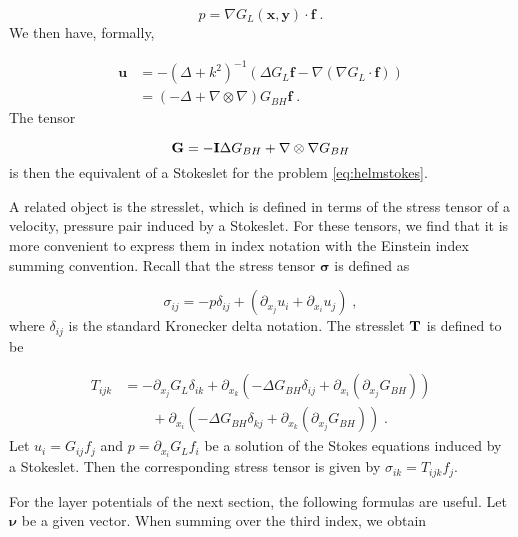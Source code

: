 \documentclass[preprint,12pt]{article}
\def\xx{{\boldsymbol x}}
\def\yy{{\boldsymbol y}}
\def\uu{{\boldsymbol u}}
\def\ff{{\boldsymbol f}}
\def\GG{{\bf G}}
\def\II{{\bf I}}
\def\TT{{\bf T}}
\def\bsigma{{\boldsymbol \sigma}}
\def\bnu{{\boldsymbol \nu}}
\begin{document}
\begin{equation}
  p = \nabla G_L(\xx,\yy) \cdot \ff \; .
\end{equation}
We then have, formally,

\begin{align}
  \uu &= - (\Delta + k^2)^{-1} ( \Delta G_L \ff
  - \nabla (\nabla G_L \cdot \ff ) ) \\
  &= \left ( -\Delta + \nabla \otimes \nabla \right )
  G_{BH} \ff \; .
\end{align}
The tensor

\begin{equation}
  \GG = - \II \Delta G_{BH} + \nabla \otimes \nabla G_{BH}
\end{equation}
is then the equivalent of a Stokeslet
\cite{pozrikidis1992boundary} for the problem
\eqref{eq:helmstokes}.

A related object is the stresslet, which is defined
in terms of the stress tensor of a velocity, pressure
pair induced by a Stokeslet. For these tensors, we find
that it is more convenient to express them in index notation
with the Einstein index summing convention.
Recall that the stress tensor $\bsigma$ is defined as 

\begin{equation}
  \sigma_{ij} = -p \delta_{ij} + \left ( \partial_{x_j}u_i
  +\partial_{x_i} u_j \right ) \; ,
\end{equation}
where $\delta_{ij}$ is the standard Kronecker delta notation.
The stresslet $\TT$ is defined to be

\begin{align}
  T_{ijk} &= - \partial_{x_j} G_L \delta_{ik}
  + \partial_{x_k} \left ( -\Delta G_{BH} \delta_{ij} +
  \partial_{x_i} \left(\partial_{x_j} G_{BH} \right) \right)
  \nonumber \\
  & \qquad+ \partial_{x_i} \left ( -\Delta G_{BH} \delta_{kj} +
  \partial_{x_k} \left(\partial_{x_j} G_{BH} \right) \right)
  \; .
\end{align}
Let $u_i = G_{ij} f_j$ and $p = \partial_{x_i} G_L f_i$ be a
solution of the Stokes equations induced by a Stokeslet.
Then the corresponding stress tensor is given by
$\sigma_{ik} = T_{ijk} f_j$.

For the layer potentials of the next section, the following
formulas are useful. Let $\bnu$ be a given vector. When
summing over the third index, we obtain
\end{document}
